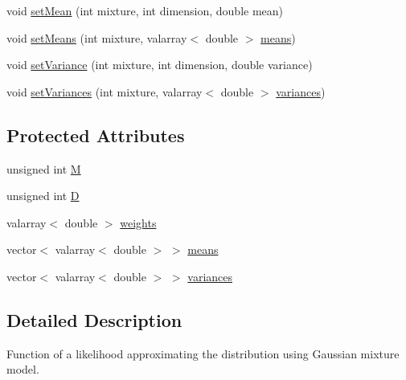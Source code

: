 \begin{DoxyCompactItemize}
void \hyperlink{classspeech_1_1HMMLexicon_1_1GMMLikelihoodFunction_ae7de73b5ab1d8082773450aeb012a56a}{set\+Mean} (int mixture, int dimension, double mean)
\item 
void \hyperlink{classspeech_1_1HMMLexicon_1_1GMMLikelihoodFunction_aa7dde74f2d993c09c649fb98294e300b}{set\+Means} (int mixture, valarray$<$ double $>$ \hyperlink{classspeech_1_1HMMLexicon_1_1GMMLikelihoodFunction_a81095daa04f62f40f9096c3f05bbedd7}{means})
\item 
void \hyperlink{classspeech_1_1HMMLexicon_1_1GMMLikelihoodFunction_ad0ea26f1757fc88599a91b42ce52d7f2}{set\+Variance} (int mixture, int dimension, double variance)
\item 
void \hyperlink{classspeech_1_1HMMLexicon_1_1GMMLikelihoodFunction_aa83c7519bd307ea5c47dcbdff381b602}{set\+Variances} (int mixture, valarray$<$ double $>$ \hyperlink{classspeech_1_1HMMLexicon_1_1GMMLikelihoodFunction_a9e996ef1a355aafa7143b5e5d2bf6b8a}{variances})
\end{DoxyCompactItemize}
\subsection*{Protected Attributes}
\begin{DoxyCompactItemize}
\item 
unsigned int \hyperlink{classspeech_1_1HMMLexicon_1_1GMMLikelihoodFunction_aa163286d0699faf1dd14b01b6e118c13}{M}
\item 
unsigned int \hyperlink{classspeech_1_1HMMLexicon_1_1GMMLikelihoodFunction_a94b3da253b242046d0999c6138306fb3}{D}
\item 
valarray$<$ double $>$ \hyperlink{classspeech_1_1HMMLexicon_1_1GMMLikelihoodFunction_aa3511faf53d4e9209d46a4af968ae4a7}{weights}
\item 
vector$<$ valarray$<$ double $>$ $>$ \hyperlink{classspeech_1_1HMMLexicon_1_1GMMLikelihoodFunction_a81095daa04f62f40f9096c3f05bbedd7}{means}
\item 
vector$<$ valarray$<$ double $>$ $>$ \hyperlink{classspeech_1_1HMMLexicon_1_1GMMLikelihoodFunction_a9e996ef1a355aafa7143b5e5d2bf6b8a}{variances}
\end{DoxyCompactItemize}


\subsection{Detailed Description}
Function of a likelihood approximating the distribution using Gaussian mixture model. 

